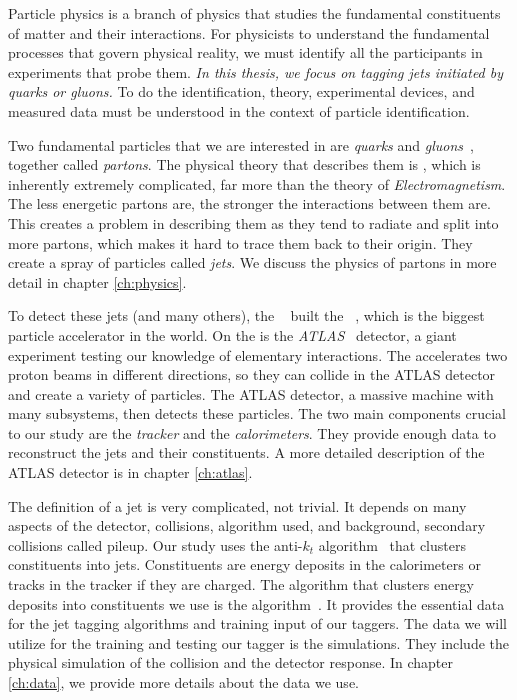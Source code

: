 

Particle physics is a branch of physics that studies the fundamental constituents of matter and their interactions.
For physicists to understand the fundamental processes that govern physical reality, we must identify all the participants in experiments that probe them. 
\emph{In this thesis, we focus on tagging jets initiated by quarks or gluons.}
To do the identification, theory, experimental devices, and measured data must be understood in the context of particle identification.

Two fundamental particles that we are interested in are \emph{quarks} and \emph{gluons}~\cite{quarks}, together called \emph{partons}.
The physical theory that describes them is \QCD, which is inherently extremely complicated, far more than the theory of \emph{Electromagnetism}.
The less energetic partons are, the stronger the interactions between them are. 
This creates a problem in describing them as they tend to radiate and split into more partons, which makes it hard to trace them back to their origin.
They create a spray of particles called \emph{jets}.
We discuss the physics of partons in more detail in chapter \cref{ch:physics}.

To detect these jets (and many others), the \CERN~\cite{cern} built the \LHC~\cite{LHC}, which is the biggest particle accelerator in the world.
On the \LHC is the \emph{ATLAS}~\cite{ATLAS} detector, a giant experiment testing our knowledge of elementary interactions. 
The \LHC accelerates two proton beams in different directions, so they can collide in the ATLAS detector and create a variety of particles.
The ATLAS detector, a massive machine with many subsystems, then detects these particles.
The two main components crucial to our study are the \emph{tracker} and the \emph{calorimeters}.
They provide enough data to reconstruct the jets and their constituents.
A more detailed description of the ATLAS detector is in chapter \cref{ch:atlas}.

The definition of a jet is very complicated, not trivial.
It depends on many aspects of the detector, collisions, algorithm used, and background, secondary collisions called pileup.
Our study uses the anti-$k_t$ algorithm~\cite{antikt} that clusters constituents into jets.
Constituents are energy deposits in the calorimeters or tracks in the tracker if they are charged.
The algorithm that clusters energy deposits into constituents we use is the \PFa algorithm~\cite{PFO}.
It provides the essential data for the jet tagging algorithms and training input of our taggers.
The data we will utilize for the training and testing our tagger is the \MC simulations.
They include the physical simulation of the collision and the detector response.
In chapter \cref{ch:data}, we provide more details about the data we use.

